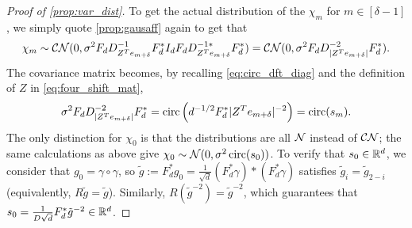 \begin{proof}[Proof of \cref{prop:var_dist}]
  To get the actual distribution of the $\chi_m$ for $m \in [\delta - 1]$, we simply quote \cref{prop:gausaff} again to get that \[\chi_m \sim \mathcal{C N}(0, \sigma^2 F_d D^{-1}_{Z^T e_{m + \delta}} F_d^* I_d F_d D^{-1*}_{Z^T e_{m + \delta}} F_d^*) = \mathcal{C N}(0, \sigma^2 F_d D^{-2}_{\lvert Z^T e_{m + \delta}\rvert} F_d^*).\] The covariance matrix becomes, by recalling \eqref{eq:circ_dft_diag} and the definition of $Z$ in \eqref{eq:four_shift_mat}, \[\sigma^2 F_d D^{-2}_{\lvert Z^T e_{m + \delta}\rvert} F_d^* = \operatorname{circ}\left(d^{-1/2} F_d^* \lvert Z^T e_{m + \delta}\rvert^{-2}\right) = \operatorname{circ}(s_m).\]  The only distinction for $\chi_0$ is that the distributions are all $\mathcal{N}$ instead of $\mathcal{C N}$; the same calculations as above give $\chi_0 \sim \mathcal{N}(0, \sigma^2 \operatorname{circ}(s_0))$.  To verify that $s_0 \in \mathbb{R}^d$, we consider that $g_0 = \gamma \circ \gamma$, so $\tilde{g} := F_d^* g_0 = \frac{1}{\sqrt{d}} (F_d^* \gamma) * (F_d^* \gamma) $ satisfies $\tilde{g}_i = \tilde{g}_{2 - i}$ (equivalently, $R \tilde{g} = \tilde{g}$).  Similarly, $R(\tilde{g}^{-2}) = \tilde{g}^{-2}$, which guarantees that $s_0 = \frac{1}{D \sqrt{d}} F_d^* \tilde{g}^{-2} \in \mathbb{R}^d$.
\end{proof}
